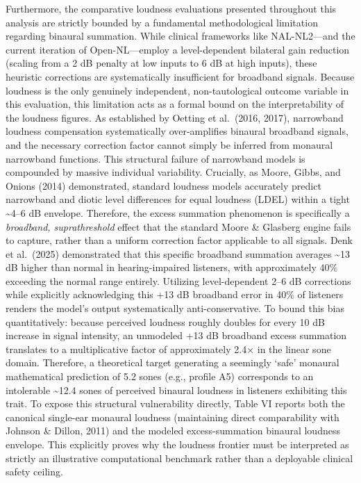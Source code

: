 \documentclass[
  12pt,
]{article}
\begin{document}
Furthermore, the comparative loudness evaluations presented throughout
this analysis are strictly bounded by a fundamental methodological
limitation regarding binaural summation. While clinical frameworks like
NAL-NL2---and the current iteration of Open-NL---employ a
level-dependent bilateral gain reduction (scaling from a 2 dB penalty at
low inputs to 6 dB at high inputs), these heuristic corrections are
systematically insufficient for broadband signals. Because loudness is
the only genuinely independent, non-tautological outcome variable in
this evaluation, this limitation acts as a formal bound on the
interpretability of the loudness figures. As established by Oetting et
al.~(2016, 2017), narrowband loudness compensation systematically
over-amplifies binaural broadband signals, and the necessary correction
factor cannot simply be inferred from monaural narrowband functions.
This structural failure of narrowband models is compounded by massive
individual variability. Crucially, as Moore, Gibbs, and Onions (2014)
demonstrated, standard loudness models accurately predict narrowband and
diotic level differences for equal loudness (LDEL) within a tight
\textasciitilde4--6 dB envelope. Therefore, the excess summation
phenomenon is specifically a \emph{broadband, suprathreshold} effect
that the standard Moore \& Glasberg engine fails to capture, rather than
a uniform correction factor applicable to all signals. Denk et
al.~(2025) demonstrated that this specific broadband summation averages
\textasciitilde13 dB higher than normal in hearing-impaired listeners,
with approximately 40\% exceeding the normal range entirely. Utilizing
level-dependent 2--6 dB corrections while explicitly acknowledging this
+13 dB broadband error in 40\% of listeners renders the model's output
systematically anti-conservative. To bound this bias quantitatively:
because perceived loudness roughly doubles for every 10 dB increase in
signal intensity, an unmodeled +13 dB broadband excess summation
translates to a multiplicative factor of approximately 2.4\(\times\) in
the linear sone domain. Therefore, a theoretical target generating a
seemingly `safe' monaural mathematical prediction of 5.2 sones (e.g.,
profile A5) corresponds to an intolerable \textasciitilde12.4 sones of
perceived binaural loudness in listeners exhibiting this trait. To
expose this structural vulnerability directly, Table VI reports both the
canonical single-ear monaural loudness (maintaining direct comparability
with Johnson \& Dillon, 2011) and the modeled excess-summation binaural
loudness envelope. This explicitly proves why the loudness frontier must
be interpreted as strictly an illustrative computational benchmark
rather than a deployable clinical safety ceiling.
\end{document}
